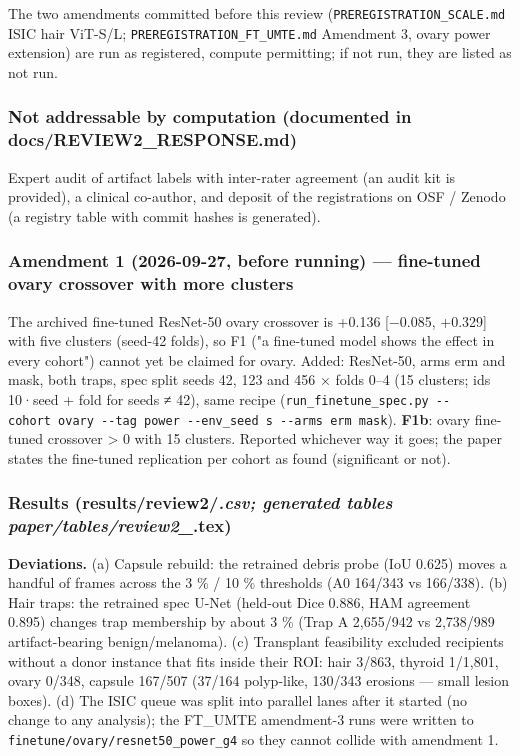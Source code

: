 {The two amendments committed before this review (\texttt{PREREGISTRATION\_SCALE.md} ISIC hair ViT-S/L;
\texttt{PREREGISTRATION\_FT\_UMTE.md} Amendment 3, ovary power extension) are run as registered, compute permitting; if not
run, they are listed as not run.

\subsubsection{Not addressable by computation (documented in docs/REVIEW2\_RESPONSE.md)}\label{not-addressable-by-computation-documented-in-docsreview2_responsemd}

Expert audit of artifact labels with inter-rater agreement (an audit kit is provided), a clinical co-author, and
deposit of the registrations on OSF / Zenodo (a registry table with commit hashes is generated).

\subsubsection{Amendment 1 (2026-09-27, before running) --- fine-tuned ovary crossover with more clusters}\label{amendment-1-2026-09-27-before-running--fine-tuned-ovary-crossover-with-more-clusters}

The archived fine-tuned ResNet-50 ovary crossover is +0.136 {[}−0.085, +0.329{]} with five clusters (seed-42 folds), so
F1 ("a fine-tuned model shows the effect in every cohort") cannot yet be claimed for ovary. Added: ResNet-50, arms erm
and mask, both traps, spec split seeds 42, 123 and 456 × folds 0--4 (15 clusters; ids 10·seed + fold for seeds ≠ 42),
same recipe (\texttt{run\_finetune\_spec.py\ -\/-cohort\ ovary\ -\/-tag\ power\ -\/-env\_seed\ s\ -\/-arms\ erm\ mask}). \textbf{F1b}: ovary
fine-tuned crossover \textgreater{} 0 with 15 clusters. Reported whichever way it goes; the paper states the fine-tuned replication
per cohort as found (significant or not).

\subsubsection{\texorpdfstring{Results (results/review2/\emph{.csv; generated tables paper/tables/review2\_}.tex)}{Results (results/review2/.csv; generated tables paper/tables/review2\_.tex)}}\label{results-resultsreview2csv-generated-tables-papertablesreview2_tex}

\textbf{Deviations.} (a) Capsule rebuild: the retrained debris probe (IoU 0.625) moves a handful of frames across the 3 \% /
10 \% thresholds (A0 164/343 vs 166/338). (b) Hair traps: the retrained spec U-Net (held-out Dice 0.886, HAM agreement
0.895) changes trap membership by about 3 \% (Trap A 2,655/942 vs 2,738/989 artifact-bearing benign/melanoma).
(c) Transplant feasibility excluded recipients without a donor instance that fits inside their ROI: hair 3/863,
thyroid 1/1,801, ovary 0/348, capsule 167/507 (37/164 polyp-like, 130/343 erosions --- small lesion boxes).
(d) The ISIC queue was split into parallel lanes after it started (no change to any analysis); the FT\_UMTE amendment-3
runs were written to \texttt{finetune/ovary/resnet50\_power\_g4} so they cannot collide with amendment 1.

}
